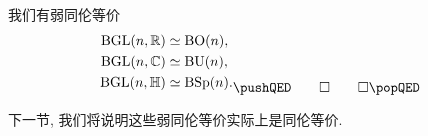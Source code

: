 \begin{corollary}
    我们有弱同伦等价
    \[ \begin{aligned}[b]
        \upB \GL(n, \bbR) & \simeq \upB \upO(n), \\
        \upB \GL(n, \bbC) & \simeq \upB \upU(n), \\
        \upB \GL(n, \bbH) & \simeq \upB \Sp(n). \\
    \end{aligned} \thmqedhere \]
\end{corollary}

下一节, 我们将说明这些弱同伦等价实际上是同伦等价.

